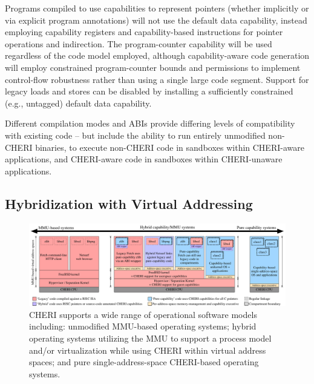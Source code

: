 Programs compiled to use capabilities to represent pointers (whether
implicitly or via explicit program annotations) will not use the default data
capability, instead employing capability registers and capability-based
instructions for pointer operations and indirection.
The program-counter capability will be used regardless of the code model
employed, although capability-aware code generation will employ constrained
program-counter bounds and permissions to implement control-flow robustness
rather than using a single large code segment.
Support for legacy loads and stores can be disabled by installing a
sufficiently constrained (e.g., untagged) default data capability.

Different compilation modes and ABIs provide differing levels of compatibility
with existing code -- but include the ability to run entirely unmodified
non-CHERI binaries, to execute non-CHERI code in sandboxes within CHERI-aware
applications, and CHERI-aware code in sandboxes within CHERI-unaware
applications.

\subsection{Hybridization with Virtual Addressing}
\label{sec:model-hybridization-virtual-addressing}

\begin{figure}[t]
\centering
\includegraphics[width=\columnwidth]{fig-cheri-high-level.pdf}
\caption{CHERI supports a wide range of operational software models including:
unmodified MMU-based operating systems; hybrid operating systems
utilizing the MMU to support a process model and/or virtualization while
using CHERI within virtual address spaces; and pure single-address-space
CHERI-based operating systems.}
\label{fig:fig-os-models}
\end{figure}

